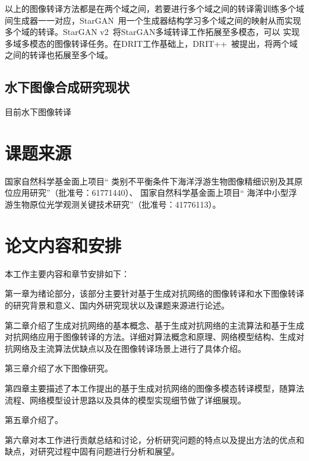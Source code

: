 以上的图像转译方法都是在两个域之间，若要进行多个域之间的转译需训练多个域间生成器一一对应，StarGAN~\cite{choi2018stargan}用一个生成器结构学习多个域之间的映射从而实现多个域的转译。StarGAN v2~\cite{choi2020stargan}将StarGAN多域转译工作拓展至多模态，可以 实现多域多模态的图像转译任务。在DRIT工作基础上，DRIT++~\cite{lee2020drit++}被提出，将两个域之间的转译也拓展至多个域。


\subsection{水下图像合成研究现状} 
目前水下图像转译


\section{课题来源}
国家自然科学基金面上项目“ 类别不平衡条件下海洋浮游生物图像精细识别及其原位应用研究”（批准号：61771440）、   国家自然科学基金面上项目“ 海洋中小型浮游生物原位光学观测关键技术研究”（批准号：41776113）。


\section{论文内容和安排}
本工作主要内容和章节安排如下：

第一章为绪论部分，该部分主要针对基于生成对抗网络的图像转译和水下图像转译的研究背景和意义、国内外研究现状以及课题来源进行论述。

第二章介绍了生成对抗网络的基本概念、基于生成对抗网络的主流算法和基于生成对抗网络应用于图像转译的方法。详细对算法概念和原理、网络模型结构、生成对抗网络及主流算法优缺点以及在图像转译场景上进行了具体介绍。

第三章介绍了水下图像研究。

第四章主要描述了本工作提出的基于生成对抗网络的图像多模态转译模型，随算法流程、网络模型设计思路以及具体的模型实现细节做了详细展现。

第五章介绍了。

第六章对本工作进行贡献总结和讨论，分析研究问题的特点以及提出方法的优点和缺点，对研究过程中固有问题进行分析和展望。